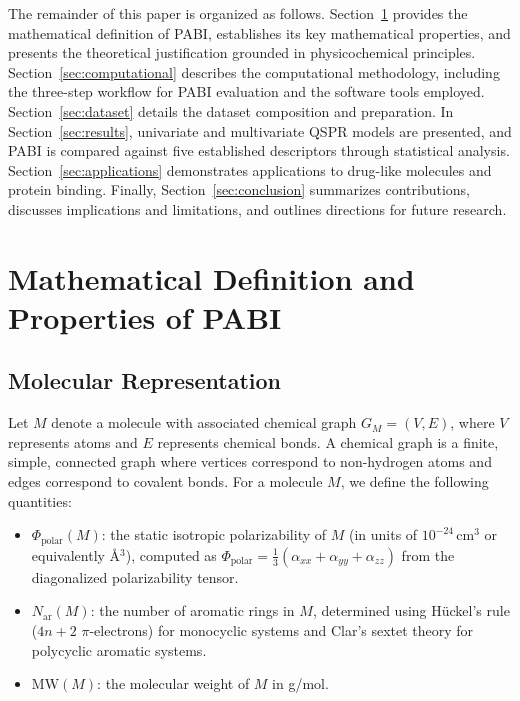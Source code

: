\documentclass[12pt,a4paper]{article}
\begin{document}
The remainder of this paper is organized as follows. Section~\ref{sec:math} provides the mathematical definition of PABI, establishes its key mathematical properties, and presents the theoretical justification grounded in physicochemical principles. Section~\ref{sec:computational} describes the computational methodology, including the three-step workflow for PABI evaluation and the software tools employed. Section~\ref{sec:dataset} details the dataset composition and preparation. In Section~\ref{sec:results}, univariate and multivariate QSPR models are presented, and PABI is compared against five established descriptors through statistical analysis. Section~\ref{sec:applications} demonstrates applications to drug-like molecules and protein binding. Finally, Section~\ref{sec:conclusion} summarizes contributions, discusses implications and limitations, and outlines directions for future research.

\section{Mathematical Definition and Properties of PABI}
\label{sec:math}

\subsection{Molecular Representation}

Let $M$ denote a molecule with associated chemical graph $G_M = (V, E)$, where $V$ represents atoms and $E$ represents chemical bonds. A chemical graph is a finite, simple, connected graph where vertices correspond to non-hydrogen atoms and edges correspond to covalent bonds\cite{todeschini2009molecular}. For a molecule $M$, we define the following quantities:

\begin{itemize}[leftmargin=2em]
\item $\Phi_{\text{polar}}(M)$: the static isotropic polarizability of $M$ (in units of $10^{-24}\,\text{cm}^3$ or equivalently \AA$^3$), computed as $\Phi_{\text{polar}} = \frac{1}{3}(\alpha_{xx} + \alpha_{yy} + \alpha_{zz})$ from the diagonalized polarizability tensor\cite{miller2007molecular}.
\item $N_{\text{ar}}(M)$: the number of aromatic rings in $M$, determined using H\"{u}ckel's rule ($4n+2$ $\pi$-electrons) for monocyclic systems and Clar's sextet theory for polycyclic aromatic systems\cite{chen2005nucleus}.
\item $\text{MW}(M)$: the molecular weight of $M$ in g/mol.
\end{itemize}
\end{document}
